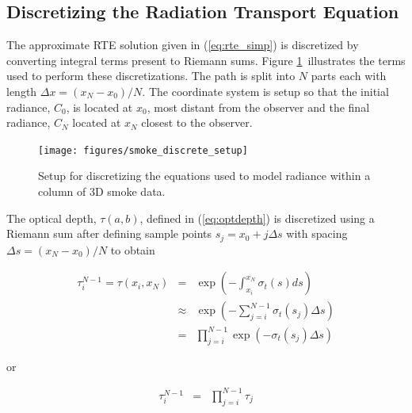 
\subsection{Discretizing the Radiation Transport Equation}
\newcommand{\htau}[1]{\tau_{#1}^{N-1}}
\newcommand{\halpha}[1]{\alpha_{#1}^{N-1}}
\newcommand{\sigai}[1]{\sigma_{a,#1}}
\newcommand{\Lei}[1]{C_{e,#1}}
\newcommand{\Lhatj}[1]{C_{#1}^N}
\newcommand{\Lhatjj}[1]{\hat{C}_{#1}^N}
\newcommand{\Chatjj}[1]{\hat{C}_{#1}^N}
\newcommand{\Leii}[1]{\hat{C}_{e,#1}}

The approximate RTE solution given in (\ref{eq:rte_simp}) is discretized by converting integral terms present to Riemann sums. Figure \ref{fig:smokediscretesetup}\ illustrates the terms used to perform these discretizations.  The path is split into $N$ parts each with length $\Delta x=(x_N-x_0)/N$.  The coordinate system is setup so that the initial radiance, $C_0$, is located at $x_0$, most distant from the observer and the final radiance, $C_N$ located at $x_N$ closest to the observer.

\begin{figure}[\figoptions]
\begin{center}
\texttt{[image: figures/smoke\_discrete\_setup]}
\end{center}
\caption {Setup for discretizing the equations used to model
radiance within a column of 3D smoke data.}
\label{fig:smokediscretesetup}
\end{figure}

The optical depth, $\tau(a,b)$, defined in (\ref{eq:optdepth}) is discretized using a Riemann sum  after defining sample points $s_j=x_0+j\Delta s$ with spacing $\Delta s=(x_N-x_0)/N$ to obtain

\begin{eqnarray*}
\htau{i}=\tau(x_i,x_N)&=&\exp\left(-\int_{x_i}^{x_N}\sigma_t(s)ds\right)\\
&\approx&\exp\left(-\sum_{j=i}^{N-1}\sigma_t(s_j)\Delta s\right)\\
&=&\prod_{j=i}^{N-1}\exp\left(-\sigma_t(s_j)\Delta s\right)
\end{eqnarray*}

or

\begin{eqnarray*}
\htau{i}&=&\prod_{j=i}^{N-1}\tau_j
\end{eqnarray*}

